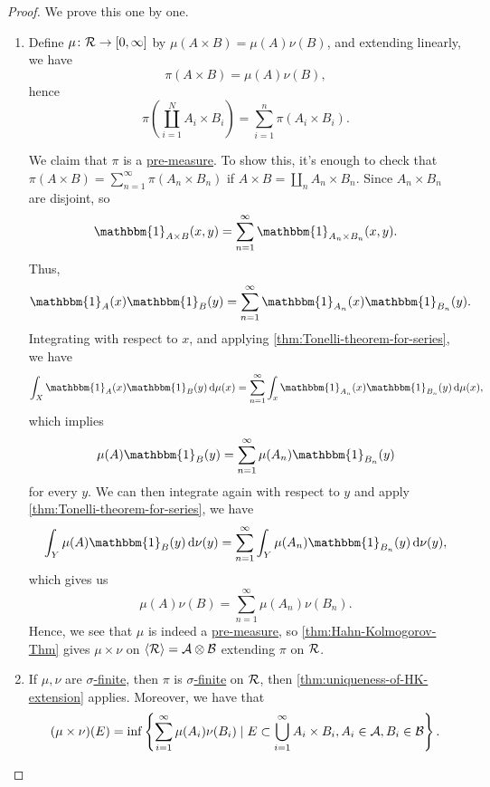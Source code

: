 \begin{proof}
	We prove this one by one.
	\begin{enumerate}[(1)]
		\item Define \(\mu \colon \mathcal{\MakeUppercase{r}} \to [0, \infty ]\) by \(\mu (A \times B) = \mu (A)\nu (B)\), and extending linearly, we have
		      \[
			      \pi (A\times B) = \mu (A)\nu (B),
		      \]
		      hence
		      \[
			      \pi \left(\coprod\limits_{i=1}^{N} A_{i} \times B_{i} \right) = \sum\limits_{i=1}^{n} \pi (A_{i} \times B_{i}).
		      \]

		      We claim that \(\pi \) is a \hyperref[def:pre-measure]{pre-measure}. To show this, it's enough to check that \(\pi (A\times B) = \sum\limits_{n=1}^{\infty} \pi (A_{n} \times B_{n} )\)
		      if \(A\times B = \coprod\limits_{n}A_{n} \times B_{n}  \). Since \(A_{n} \times B_{n} \) are disjoint, so
		      \[
			      \mathbbm{1}_{A\times B}(x, y) = \sum\limits_{n=1}^{\infty} \mathbbm{1}_{A_{n} \times B_{n} }(x, y).
		      \]
		      Thus,
		      \[
			      \mathbbm{1}_{A} (x)\mathbbm{1}_{B} (y) = \sum\limits_{n=1}^{\infty} \mathbbm{1}_{A_{n} }(x)\mathbbm{1}_{B_{n}}(y).
		      \]
		      Integrating with respect to \(x\), and applying \autoref{thm:Tonelli-theorem-for-series}, we have
		      \[
			      \int _X \mathbbm{1}_{A} (x)\mathbbm{1}_{B}(y)\,\mathrm{d} \mu (x) = \sum\limits_{n=1}^{\infty} \int _x \mathbbm{1}_{A_{n} }(x)\mathbbm{1}_{B_{n} }(y)\,\mathrm{d} \mu (x),
		      \]
		      which implies
		      \[
			      \mu (A)\mathbbm{1}_{B} (y) = \sum\limits_{n=1}^{\infty} \mu (A_{n} )\mathbbm{1}_{B_{n} }(y)
		      \]
		      for every \(y\). We can then integrate again with respect to \(y\) and apply \autoref{thm:Tonelli-theorem-for-series}, we have
		      \[
			      \int _Y \mu (A)\mathbbm{1}_{B}(y)\,\mathrm{d} \nu (y) = \sum\limits_{n=1}^{\infty} \int _Y \mu (A_{n} )\mathbbm{1}_{B_{n} }(y)\,\mathrm{d} \nu (y),
		      \]
		      which gives us
		      \[
			      \mu (A)\nu (B) = \sum\limits_{n=1}^{\infty} \mu (A_{n} )\nu (B_{n} ).
		      \]
		      Hence, we see that \(\mu\) is indeed a \hyperref[def:pre-measure]{pre-measure}, so  \autoref{thm:Hahn-Kolmogorov-Thm} gives \(\mu \times \nu \) on \(\left< \mathcal{\MakeUppercase{r}}  \right> = \mathcal{\MakeUppercase{a}} \otimes \mathcal{\MakeUppercase{b}}  \)
		      extending \(\pi \) on \(\mathcal{\MakeUppercase{r}} \).
		\item If \(\mu , \nu \) are \hyperref[def:sigma-finite-measure]{\(\sigma\)-finite}, then \(\pi \) is  \hyperref[def:sigma-finite-measure]{\(\sigma\)-finite} on \(\mathcal{\MakeUppercase{r}} \), then
		      \autoref{thm:uniqueness-of-HK-extension} applies. Moreover, we have that
		      \[
			      (\mu \times \nu )(E) = \inf \left\{\sum\limits_{i=1}^{\infty} \mu (A_{i})\nu (B_{i})\mid E\subset \bigcup\limits_{i=1}^{\infty} A_{i} \times B_{i}, A_{i} \in \mathcal{\MakeUppercase{a}} , B_{i} \in \mathcal{\MakeUppercase{b}} \right\}.
		      \]
	\end{enumerate}
\end{proof}

